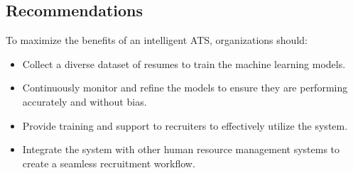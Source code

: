 \subsection{Recommendations}
To maximize the benefits of an intelligent ATS, organizations should:
\begin{itemize}
    \item Collect a diverse dataset of resumes to train the machine learning models.
    \item Continuously monitor and refine the models to ensure they are performing accurately and without bias.
    \item Provide training and support to recruiters to effectively utilize the system.
    \item Integrate the system with other human resource management systems to create a seamless recruitment workflow.
\end{itemize}

